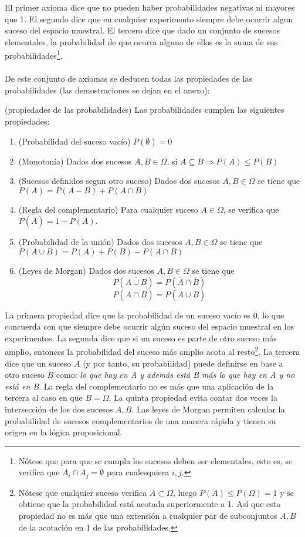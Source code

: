 El primer axioma dice que no pueden haber probabilidades negativas ni mayores que 1. El segundo dice que en cualquier experimento siempre debe ocurrir algun suceso del espacio muestral. El tercero dice que dado un conjunto de sucesos elementales, la probabilidad de que ocurra alguno de ellos es la suma de sus probabilidades\footnote{Nótese que para que se cumpla los sucesos deben ser elementales, esto es, se verifica que $A_i \cap A_j = \emptyset$ para cualesquiera $i, j$.}.\\\\
De este conjunto de axiomas se deducen todas las propiedades de las probabilidades (las demostraciones se dejan en el anexo):
\begin{definition}(propiedades de las probabilidades)
Las probabilidades cumplen las siguientes propiedades:
\begin{enumerate}
	\item (Probabilidad del suceso vacío) $P(\emptyset) = 0$
	\item (Monotonía) Dados dos sucesos $A, B \in \Omega$, si $A \subseteq B \Rightarrow P(A) \le P(B)$
	\item (Sucesos definidos segun otro suceso) Dados dos sucesos $A, B \in \Omega$ se tiene que $P(A) = P(A-B)+ P(A \cap B)$
	\item (Regla del complementario) Para cualquier suceso $A \in \Omega$, se verifica que $P(\overline{A}) = 1 - P(A)$.
	\item (Probabilidad de la unión) Dados dos sucesos $A, B \in \Omega$ se tiene que $P(A \cup B) = P(A)+P(B)-P(A \cap B)$
	\item (Leyes de Morgan) Dados dos sucesos $A, B \in \Omega$ se tiene que 
	$$P(\overline{A \cup B}) = P(\overline{A}\cap \overline{B})$$
	$$P(\overline{A \cap B}) = P(\overline{A}\cup \overline{B})$$
\end{enumerate}
\end{definition}
La primera propiedad dice que la probabilidad de un suceso vacío es 0, lo que concuerda con que siempre debe ocurrir algún suceso del espacio muestral en los experimentos. La segunda dice que si un suceso es parte de otro suceso más amplio, entonces la probabilidad del suceso más amplio acota al resto\footnote{Nótese que cualquier suceso verifica $A \subset \Omega$, luego $P(A) \le P(\Omega) = 1$ y se obtiene que la probabilidad está acotada superiormente a 1. Así que esta propiedad no es más que una extensión a cualquier par de subconjuntos $A, B$ de la acotación en 1 de las probabilidades.}. La tercera dice que un suceso $A$ (y por tanto, su probabilidad) puede definirse en base a otro suceso $B$ como: \textit{lo que hay en A y además está B más lo que hay en A y no está en B}. La regla del complementario no es más que una aplicación de la tercera al caso en que $B = \Omega$. La quinta propiedad evita contar dos veces la intersección de los dos sucesos $A, B$. Las leyes de Morgan permiten calcular la probabilidad de sucesos complementarios de una manera rápida y tienen su origen en la lógica proposicional.
